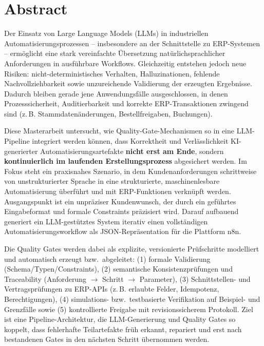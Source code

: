 \section{Abstract}
Der Einsatz von Large Language Models (LLMs) in industriellen Automatisierungsprozessen – insbesondere an der Schnittstelle zu ERP-Systemen – ermöglicht eine stark vereinfachte Übersetzung natürlichsprachlicher Anforderungen in ausführbare Workflows. Gleichzeitig entstehen jedoch neue Risiken: nicht-deterministisches Verhalten, Halluzinationen, fehlende Nachvollziehbarkeit sowie unzureichende Validierung der erzeugten Ergebnisse. Dadurch bleiben gerade jene Anwendungsfälle ausgeschlossen, in denen Prozesssicherheit, Auditierbarkeit und korrekte ERP-Transaktionen zwingend sind (z.\,B. Stammdatenänderungen, Bestellfreigaben, Buchungen).

Diese Masterarbeit untersucht, wie Quality-Gate-Mechanismen so in eine LLM-Pipeline integriert werden können, dass Korrektheit und Verlässlichkeit KI-generierter Automatisierungsartefakte \textbf{nicht erst am Ende}, sondern \textbf{kontinuierlich im laufenden Erstellungsprozess} abgesichert werden. Im Fokus steht ein praxisnahes Szenario, in dem Kundenanforderungen schrittweise von unstrukturierter Sprache in eine strukturierte, maschinenlesbare Automatisierung überführt und mit ERP-Funktionen verknüpft werden. Ausgangspunkt ist ein unpräziser Kundenwunsch, der durch ein geführtes Eingabeformat und formale Constraints präzisiert wird. Darauf aufbauend generiert ein LLM-gestütztes System iterativ einen vollständigen Automatisierungsworkflow als JSON-Repräsentation für die Plattform n8n.

Die Quality Gates werden dabei als explizite, versionierte Prüfschritte modelliert und automatisch erzeugt bzw.\ abgeleitet: (1) formale Validierung (Schema/Typen/Constraints), (2) semantische Konsistenzprüfungen und Traceability (Anforderung $\rightarrow$ Schritt $\rightarrow$ Parameter), (3) Schnittstellen- und Vertragsprüfungen zu ERP-APIs (z.\,B. erlaubte Felder, Idempotenz, Berechtigungen), (4) simulations- bzw.\ testbasierte Verifikation auf Beispiel- und Grenzfälle sowie (5) kontrollierte Freigabe mit revisionssicherem Protokoll. Ziel ist eine Pipeline-Architektur, die LLM-Generierung und Quality Gates so koppelt, dass fehlerhafte Teilartefakte früh erkannt, repariert und erst nach bestandenen Gates in den nächsten Schritt übernommen werden.